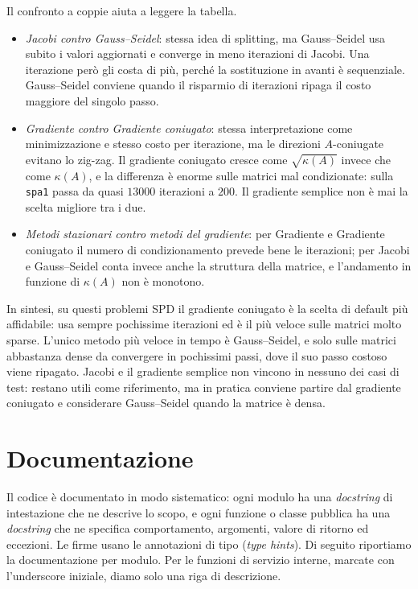 \documentclass[11pt,a4paper]{article}
\begin{document}
Il confronto a coppie aiuta a leggere la tabella.
\begin{itemize}[leftmargin=1.6em]
  \item \emph{Jacobi contro Gauss--Seidel}: stessa idea di splitting, ma
  Gauss--Seidel usa subito i valori aggiornati e converge in meno iterazioni di
  Jacobi. Una iterazione però gli costa di più, perché la sostituzione in avanti
  è sequenziale. Gauss--Seidel conviene quando il risparmio di iterazioni ripaga
  il costo maggiore del singolo passo.
  \item \emph{Gradiente contro Gradiente coniugato}: stessa interpretazione come
  minimizzazione e stesso costo per iterazione, ma le direzioni $A$-coniugate
  evitano lo zig-zag. Il gradiente coniugato cresce come $\sqrt{\kappa(A)}$ invece
  che come $\kappa(A)$, e la differenza è enorme sulle matrici mal condizionate:
  sulla \texttt{spa1} passa da quasi $13000$ iterazioni a $200$. Il gradiente
  semplice non è mai la scelta migliore tra i due.
  \item \emph{Metodi stazionari contro metodi del gradiente}: per Gradiente e
  Gradiente coniugato il numero di condizionamento prevede bene le iterazioni;
  per Jacobi e Gauss--Seidel conta invece anche la struttura della matrice, e
  l'andamento in funzione di $\kappa(A)$ non è monotono.
\end{itemize}

In sintesi, su questi problemi SPD il gradiente coniugato è la scelta di default
più affidabile: usa sempre pochissime iterazioni ed è il più veloce sulle matrici
molto sparse. L'unico metodo più veloce in tempo è Gauss--Seidel, e solo sulle
matrici abbastanza dense da convergere in pochissimi passi, dove il suo passo
costoso viene ripagato. Jacobi e il gradiente semplice non vincono in nessuno dei
casi di test: restano utili come riferimento, ma in pratica conviene partire dal
gradiente coniugato e considerare Gauss--Seidel quando la matrice è densa.

\section{Documentazione}\label{sec:documentazione}
Il codice è documentato in modo sistematico: ogni modulo ha una \emph{docstring}
di intestazione che ne descrive lo scopo, e ogni funzione o classe pubblica ha
una \emph{docstring} che ne specifica comportamento, argomenti, valore di ritorno
ed eccezioni. Le firme usano le annotazioni di tipo (\emph{type hints}). Di
seguito riportiamo la documentazione per modulo. Per le funzioni di servizio
interne, marcate con l'underscore iniziale, diamo solo una riga di descrizione.
\end{document}

